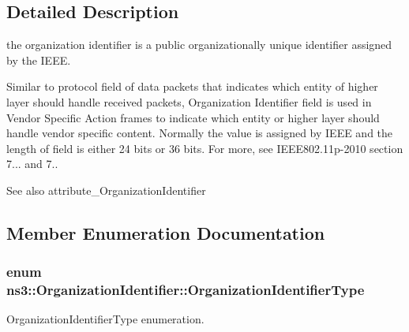 \subsection{Detailed Description}
the organization identifier is a public organizationally unique identifier assigned by the I\+E\+EE.

Similar to protocol field of data packets that indicates which entity of higher layer should handle received packets, Organization Identifier field is used in Vendor Specific Action frames to indicate which entity or higher layer should handle vendor specific content. Normally the value is assigned by I\+E\+EE and the length of field is either 24 bits or 36 bits. For more, see I\+E\+E\+E802.\+11p-\/2010 section 7... and 7.. 

\begin{DoxySeeAlso}{See also}
attribute\+\_\+\+Organization\+Identifier 
\end{DoxySeeAlso}


\subsection{Member Enumeration Documentation}
\subsubsection[{\texorpdfstring{Organization\+Identifier\+Type}{OrganizationIdentifierType}}]{\setlength{\rightskip}{0pt plus 5cm}enum {\bf ns3\+::\+Organization\+Identifier\+::\+Organization\+Identifier\+Type}}\hypertarget{classns3_1_1OrganizationIdentifier_a196c774c611f936ef8b7d2a760ff5ba2}{}\label{classns3_1_1OrganizationIdentifier_a196c774c611f936ef8b7d2a760ff5ba2}


Organization\+Identifier\+Type enumeration. 

